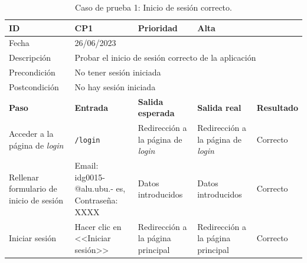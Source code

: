 \begin{table}[H]
\small
\begin{tabular}{p{} p{} p{} p{} p{}}
\cellcolor{gray!25}
ID   & CP1 & \cellcolor{gray!25} Prioridad   & Alta \\ \hline
\cellcolor{gray!25} Fecha	&	\multicolumn{4}{l}{26/06/2023} \\ \hline
\cellcolor{gray!25} Descripción		&	\multicolumn{4}{l}{Probar el inicio de sesión correcto de la aplicación} \\ \hline                                            
\cellcolor{gray!25}
Precondición  & \multicolumn{4}{l}{No tener sesión iniciada} \\ \hline
\cellcolor{gray!25} Postcondición & \multicolumn{4}{l}{No hay sesión iniciada}                                                                                                      \\ \hline
\rowcolor{gray!25}
\textbf{Paso}   & \textbf{Entrada} & \textbf{Salida esperada} & \textbf{Salida real} & \textbf{Resultado} \\ \hline
Acceder a la página de \textit{login} 
& \texttt{/login}                                                                             
& Redirección a la página de \textit{login}                                    
& Redirección a la página de \textit{login}                                   
& Correcto                            
\\ \hline
Rellenar formulario de inicio de sesión
& Email: idg0015-
@alu.ubu.-
es, Contraseña: XXXX                                                                                                        
& Datos introducidos                               
& Datos introducidos                                
& Correcto                            
\\ \hline
Iniciar sesión
& Hacer clic en <<Iniciar sesión>>
& Redirección a la página principal                                 
& Redirección a la página principal                                 
& Correcto                            
\\ \hline                 
\end{tabular}
\caption{Caso de prueba 1: Inicio de sesión correcto.} \label{table:CP1}
\end{table}

